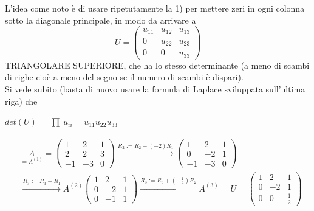 \documentclass[12pt,a4paper]{article}
\newcommand{\inter}{\begin{matrix}\prod\end{matrix}}
\begin{document}
L'idea come noto è di usare ripetutamente la 1) per mettere zeri in ogni colonna sotto la diagonale principale, in modo da arrivare a 
\begin{equation*}
    U = \begin{pmatrix}
        u_{11} & u_{12} & u_{13} \\
        0 & u_{22} & u_{23} \\
        0 & 0 & u_{33}
    \end{pmatrix}
\end{equation*}
TRIANGOLARE SUPERIORE, che ha lo stesso determinante (a meno di scambi di righe cioè a meno del segno se il numero di scambi è dispari).\\
Si vede subito (basta di nuovo usare la formula di Laplace sviluppata sull'ultima riga) che
\begin{center}
    $det(U) = \inter u_{ii} = u_{11} u_{22} u_{33}$
\end{center}
\begin{equation*}
    \begin{split}
        & \underset{=A^{(1)}}{A}=\begin{pmatrix}
              1 & 2 & 1 \\
              2 & 2 & 3 \\
              -1 & -3 & 0
        \end{pmatrix} \overset{R_2 := R_2 + (-2) R_1}{\longrightarrow} \begin{pmatrix}
                  1 & 2 & 1 \\
                  0 & -2 & 1 \\
                 -1 & -3 & 0
        \end{pmatrix} \\
        & \overset{R_3 := R_3 + R_1}{\longrightarrow} A^{(2)} \begin{pmatrix}
                  1 & 2 & 1 \\
                  0 & -2 & 1 \\
                  0 & -1 & 1
        \end{pmatrix} \overset{R_3 := R_3 + ( -\frac{1}{2}) R_2}{\longrightarrow} A^{(3)} = U = \begin{pmatrix}
                  1 & 2 & 1 \\
                  0 & -2 & 1 \\
                  0 & 0 & \frac{1}{2}
        \end{pmatrix}
    \end{split}
\end{equation*}
\end{document}
